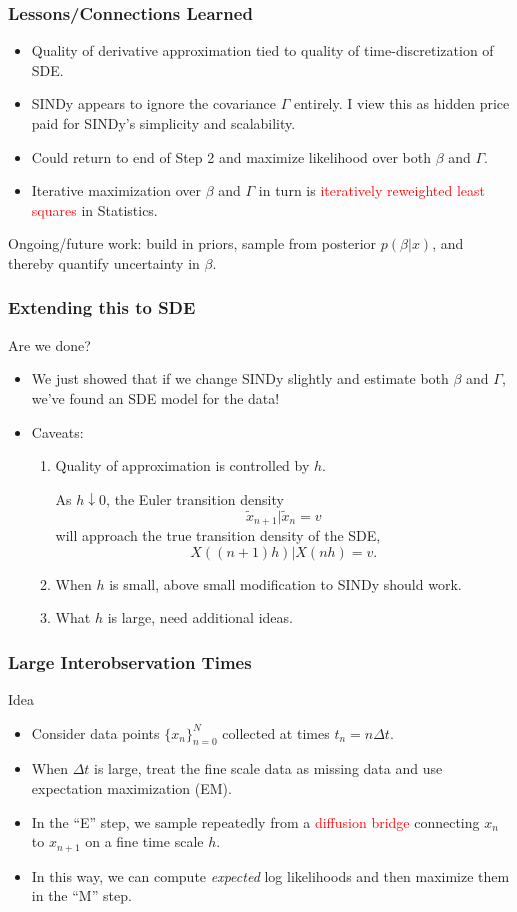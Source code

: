 \documentclass{beamer}
\begin{document}
\begin{frame}
\frametitle{Lessons/Connections Learned}
\begin{itemize}
\item Quality of derivative approximation tied to quality of time-discretization of SDE.
\item SINDy appears to ignore the covariance $\Gamma$ entirely.  I view this as hidden price paid for SINDy's simplicity and scalability.
\item Could return to end of Step 2 and maximize likelihood over both $\beta$ and $\Gamma$.
\item Iterative maximization over $\beta$ and $\Gamma$ in turn is \textcolor{red}{iteratively reweighted least squares} in Statistics.
\end{itemize}
Ongoing/future work: build in priors, sample from posterior $p(\beta | x)$, and thereby quantify uncertainty in $\beta$.
\end{frame}

\begin{frame}
\frametitle{Extending this to SDE}
\begin{block}{Are we done?}
\begin{itemize}
\item We just showed that if we change SINDy slightly and estimate both $\beta$ and $\Gamma$, we've found an SDE model for the data!
\item Caveats:
\begin{enumerate}
\item Quality of approximation is controlled by $h$.

As $h \downarrow 0$, the Euler transition density
$$
\widetilde{x}_{n+1} | \widetilde{x}_n = v
$$
will approach the true transition density of the SDE,
$$
X((n+1) h) | X( n h) = v.
$$
\item When $h$ is small, above small modification to SINDy should work.
\item What $h$ is large, need additional ideas.
\end{enumerate}
\end{itemize}
\end{block}
\end{frame}

\begin{frame}
\frametitle{Large Interobservation Times}
\begin{block}{Idea}
\begin{itemize}
\item Consider data points $\{x_n\}_{n=0}^N$ collected at times $t_n = n \Delta t$.
\item When $\Delta t$ is large, treat the fine scale data as missing data and use expectation maximization (EM).
\item In the ``E'' step, we sample repeatedly from a \textcolor{red}{diffusion bridge} connecting $x_n$ to $x_{n+1}$ on a fine time scale $h$.
\item In this way, we can compute \emph{expected} log likelihoods and then maximize them in the ``M'' step.
\end{itemize}
\end{block}
\end{frame}
\end{document}
